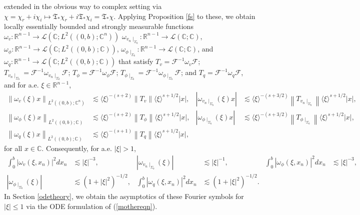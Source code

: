 \documentclass[11pt,letterpaper,reqno]{amsart}
\numberwithin{equation}{section}
\newcommand{\abs}[1]{\left\lvert#1\right\rvert}
\newcommand{\norm}[1]{\left\lVert#1\right\rVert}
\begin{document}
extended in the obvious way to complex setting via $\chi = \chi_r + i \chi_i \mapsto \mathfrak{T}_\ast \chi_r + i \mathfrak{T}_\ast \chi_i = \mathfrak{T}_\ast \chi$.  Applying  Proposition \ref{fs} to these, 
we obtain locally essentially bounded and strongly measurable functions $\omega_{v}: \mathbb{R}^{n-1} \to \mathcal{L}(\mathbb{C}; L^{2}((0,b);\mathbb{C}^{n}))$ $\omega_{v_{n}\mid_{\Sigma_{b}}} : \mathbb{R}^{n-1} \to \mathcal{L}(\mathbb{C}; \mathbb{C})$, 
$\omega_{\phi} : \mathbb{R}^{n-1} \to \mathcal{L}(\mathbb{C}; L^{2}((0,b);\mathbb{C}))$, 
$\omega_{\phi\mid_{\Sigma_{b}}}: \mathbb{R}^{n-1} \to \mathcal{L}(\mathbb{C}; \mathbb{C})$, and $\omega_{q} : \mathbb{R}^{n-1} \to \mathcal{L}(\mathbb{C}; L^{2}((0,b);\mathbb{C}))$
that satisfy \(T_{v}=\mathcal{F}^{-1}\omega_{v}\mathcal{F}\); \(T_{v_{n}\mid_{\Sigma_{b}}}=\mathcal{F}^{-1}\omega_{v_{n}\mid_{\Sigma_{b}}}\mathcal{F}\); \(T_{\phi}=\mathcal{F}^{-1}\omega_{\phi}\mathcal{F}\); \(T_{\phi\mid_{\Sigma_{b}}}=\mathcal{F}^{-1}\omega_{\phi\mid_{\Sigma_{b}}}\mathcal{F}\); and \(T_{q}=\mathcal{F}^{-1}\omega_{q}\mathcal{F}\), and for a.e. \(\xi \in \mathbb{R}^{n-1}\),
\begin{align}
    \norm{\omega_{v}(\xi)x}_{L^{2}((0,b);\mathbb{C}^{n})} &\lesssim \langle\xi \rangle^{-(s+2)}\norm{T_{v}}\langle \xi\rangle^{s+1/2} \abs{x}, 
    &\abs{\omega_{v_{n} \mid_{\Sigma_{b}}}(\xi)x} &\lesssim \langle\xi \rangle^{-(s+3/2)}\norm{T_{v_{n}\mid_{\Sigma_{b}}}}\langle \xi\rangle^{s+1/2} \abs{x},  \nonumber\\
    \norm{\omega_{\phi}(\xi)x}_{L^{2}((0,b);\mathbb{C})} &\lesssim \langle\xi \rangle^{-(s+2)}\norm{T_{\phi}}\langle \xi\rangle^{s+1/2} \abs{x}, &
    \abs{\omega_{\phi\mid_{\Sigma_{b}}}(\xi)x}&\lesssim \langle\xi \rangle^{-(s+3/2)}\norm{T_{\phi\mid_{\Sigma_{b}}}}\langle \xi\rangle^{s+1/2} \abs{x}, \nonumber\\
    \norm{\omega_{q}(\xi)x}_{L^{2}((0,b);\mathbb{C})} &\lesssim \langle\xi \rangle^{-(s+1)}\norm{T_{q}}\langle \xi\rangle^{s+1/2} \abs{x},
\end{align}
for all \(x \in \mathbb{C}\).
Consequently, for a.e. \(\abs{\xi} >1\),
\begin{align}
\int_{0}^{b}\abs{\omega_{v}(\xi,x_{n})}^{2}dx_{n} &\lesssim \abs{\xi}^{-3},  &  \abs{\omega_{v_{n}\mid_{\Sigma_{b}}}(\xi)}  &\lesssim \abs{\xi}^{-1},  &  \int_{0}^{b}\abs{\omega_{\phi}(\xi,x_{n})}^{2}dx_{n} &\lesssim \abs{\xi}^{-3}, \nonumber \\
\abs{\omega_{\phi\mid_{\Sigma_{b}}}(\xi)} &\lesssim (1+\abs{\xi}^{2})^{-1/2},  &   \int_{0}^{b}\abs{\omega_{q}(\xi,x_{n})}^{2}dx_{n} &\lesssim (1+\abs{\xi}^{2})^{-1/2}.
\end{align}
 In Section  \ref{odetheory}, we obtain the asymptotics of these Fourier symbols for \(\abs{\xi} \leq 1\) via the ODE formulation of (\ref{mothereqn}).
\end{document}
